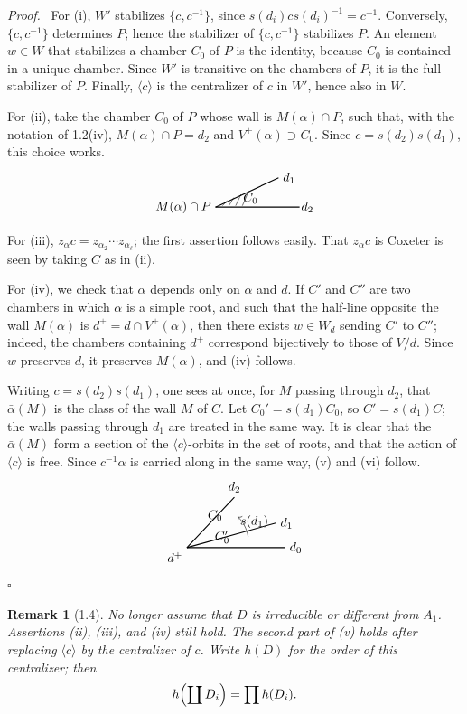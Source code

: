 \documentclass[11pt]{article}
\newcommand{\coxeterChamberOne}{%
\begin{tikzpicture}[scale=.78,baseline=-.5ex]
  \coordinate (O) at (0,0);
  \draw[thick] (O)--(3.0,0);
  \draw[thick] (O)--(2.25,1.05);
  \draw[thin] (.25,.05)--(.42,.24);
  \draw[thin] (.48,.05)--(.65,.34);
  \draw[thin] (.72,.05)--(.91,.46);
  \draw[thin] (.96,.05)--(1.18,.57);
  \node at (1.25,.32){$C_0$};
  \node[right] at (2.9,0){$d_2$};
  \node[right] at (2.25,1.05){$d_1$};
  \node[left] at (0,0){$M(\alpha)\cap P$};
\end{tikzpicture}%
}
\newcommand{\coxeterChamberTwo}{%
\begin{tikzpicture}[scale=.85,baseline=-.5ex]
  \coordinate (O) at (0,0);
  \draw[thick] (O)--(3.2,0) node[right]{$d_0$};
  \draw[thick] (O)--(2.9,.8) node[right]{$d_1$};
  \draw[thick] (O)--(1.55,1.65) node[above]{$d_2$};
  \node at (.92,1.05){$C_0$};
  \node at (1.15,.35){$C'_0$};
  \draw[->,thin] (2.0,.35) arc[start angle=9,end angle=45,radius=1.2];
  \node at (2.2,.85){$s(d_1)$};
  \node[below left] at (O){$d^+$};
\end{tikzpicture}%
}
\theoremstyle{plainen}
\newtheorem*{remarkx}{Remark}
\newenvironment{proofx}{\par\emph{Proof.}\ }{\hfill$\square$\par}
\begin{document}
\begin{proofx}
For (i), $W'$ stabilizes $\{c,c^{-1}\}$, since $s(d_i)c s(d_i)^{-1}=c^{-1}$. Conversely, $\{c,c^{-1}\}$ determines $P$; hence the stabilizer of $\{c,c^{-1}\}$ stabilizes $P$. An element $w\in W$ that stabilizes a chamber $C_0$ of $P$ is the identity, because $C_0$ is contained in a unique chamber. Since $W'$ is transitive on the chambers of $P$, it is the full stabilizer of $P$. Finally, $\langle c\rangle$ is the centralizer of $c$ in $W'$, hence also in $W$.

For (ii), take the chamber $C_0$ of $P$ whose wall is $M(\alpha)\cap P$, such that, with the notation of 1.2(iv), $M(\alpha)\cap P=d_2$ and $V^+(\alpha)\supset C_0$. Since $c=s(d_2)s(d_1)$, this choice works.
\[
\coxeterChamberOne
\]

For (iii), $z_\alpha c=z_{\alpha_2}\cdots z_{\alpha_\ell}$; the first assertion follows easily. That $z_\alpha c$ is Coxeter is seen by taking $C$ as in (ii).

For (iv), we check that $\bar\alpha$ depends only on $\alpha$ and $d$. If $C'$ and $C''$ are two chambers in which $\alpha$ is a simple root, and such that the half-line opposite the wall $M(\alpha)$ is $d^+=d\cap V^+(\alpha)$, then there exists $w\in W_d$ sending $C'$ to $C''$; indeed, the chambers containing $d^+$ correspond bijectively to those of $V/d$. Since $w$ preserves $d$, it preserves $M(\alpha)$, and (iv) follows.

Writing $c=s(d_2)s(d_1)$, one sees at once, for $M$ passing through $d_2$, that $\bar\alpha(M)$ is the class of the wall $M$ of $C$. Let $C_0'=s(d_1)C_0$, so $C'=s(d_1)C$; the walls passing through $d_1$ are treated in the same way. It is clear that the $\bar\alpha(M)$ form a section of the $\langle c\rangle$-orbits in the set of roots, and that the action of $\langle c\rangle$ is free. Since $c^{-1}\alpha$ is carried along in the same way, (v) and (vi) follow.
\[
\coxeterChamberTwo
\]
\end{proofx}

\begin{remarkx}[1.4]
No longer assume that $D$ is irreducible or different from $A_1$. Assertions (ii), (iii), and (iv) still hold. The second part of (v) holds after replacing $\langle c\rangle$ by the centralizer of $c$. Write $h(D)$ for the order of this centralizer; then
\[
 h\Bigl(\coprod D_i\Bigr)=\prod h(D_i).
\]
\end{remarkx}
\end{document}
